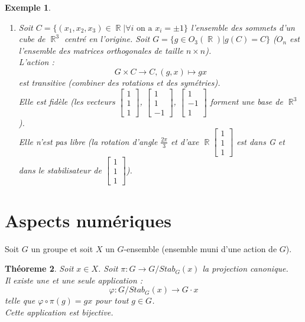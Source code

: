 \documentclass[a4paper, oneside]{report}
\theoremstyle{break}
\newtheorem{thm}{Théoreme}[section] %
\newtheorem{exem}[thm]{Exemple}
\newcommand{\x}{\times}
\DeclareMathOperator{\R}{\mathbb{R}}
\begin{document}
\begin{exem}
\begin{enumerate}
		\item Soit $C=\{(x_1,x_2,x_3) \in \R | \forall i\text{ on a } x_i= \pm 1 \}$ l'ensemble des sommets d'un cube de $\R^3$ centré en l'origine. Soit $G = \{g \in O_3(\R) | g(C)=C \}$ ($O_n$ est l'ensemble des matrices orthogonales de taille $n\x n$).\\
		L'action :
		$$G\x C \rightarrow C, (g,x)\mapsto gx$$
		est transitive (combiner des rotations et des symétries).\\
		Elle est fidèle (les vecteurs $\left[\begin{array}{l}
		1\\
		1\\
		1
		\end{array}\right]$, $\left[\begin{array}{l}
		1\\
		1\\
		-1
		\end{array}\right]$, $\left[\begin{array}{l}
		1\\
		-1\\
		1
		\end{array}\right]$ forment une base de $\R^3$).\\
		Elle n'est pas libre (la rotation d'angle $\frac{2\pi}{3}$ et d'axe $\R \left[\begin{array}{l}
		1\\
		1\\
		1
		\end{array}\right]$ est dans G et dans le stabilisateur de $\left[\begin{array}{l}
		1\\
		1\\
		1
		\end{array}\right]$).
	\end{enumerate}
\end{exem}

\section{Aspects numériques}

Soit $G$ un groupe et soit $X$ un $G$-ensemble (ensemble muni d'une action de $G$).

\begin{thm}
	Soit $x\in X$. Soit $\pi : G \rightarrow G/Stab_G(x)$ la projection canonique.\\
	Il existe une et une seule application :
	$$\varphi : G/Stab_G(x) \rightarrow G \cdot x$$
	telle que $\varphi \circ \pi(g)=gx$ pour tout $g\in G$.\\
	Cette application est bijective.
\end{thm}
\end{document}
